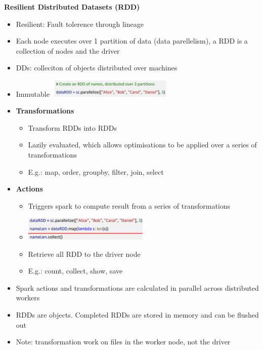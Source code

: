 \documentclass[10pt, landscape]{article}
\begin{document}
\begin{multicols}{4}
\textbf{Resilient Distributed Datasets (RDD)}
\begin{itemize}
  \item Resilient: Fault tolerence through lineage 
  \item Each node executes over 1 partition of data (data parellelism), a RDD is a collection of nodes and the driver
  \item DDs: colleciton of objects distributed over machines
  \item Immutable
  \includegraphics*[width=6cm]{rdd1}
  \item \textbf{Transformations}
  \begin{itemize}
    \item Transform RDDs into RDDs
    \item Lazily evaluated, which allows optimisations to be applied over a series of transformations
    \item E.g.: map, order, groupby, filter, join, select 
  \end{itemize}
  \item \textbf{Actions}
  \begin{itemize}
    \item Triggers spark to compute result from a series of transformations 
    \item \includegraphics*[width=6cm]{rdd2}
    \item Retrieve all RDD to the driver node 
    \item E.g.: count, collect, show, save
  \end{itemize}
  \item Spark actions and transformations are calculated in parallel across distributed workers
  \item RDDs are objects. Completed RDDs are stored in memory and can be flushed out 
  \item Note: transformation work on files in the worker node, not the driver
\end{itemize}


\end{multicols}
\end{document}
